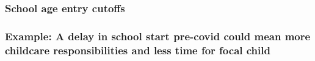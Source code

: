 \documentclass{beamer}
\begin{document}
\begin{frame}
    \label{update_scott}
    \frametitle{School age entry cutoffs}
 {
    }
\end{frame}

\begin{frame}
    \label{update_scott}
    \frametitle{Example: A delay in school start pre-covid could mean more childcare responsibilities and less time for focal child}
 {
    }
\end{frame}
\end{document}
